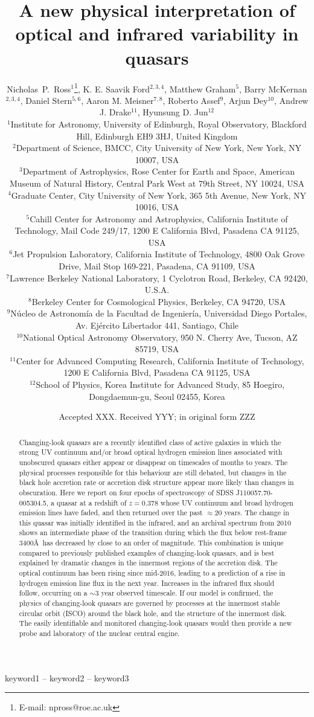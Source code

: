 \documentclass[a4paper,fleqn,usenatbib]{mnras}
\title[J1100-0053: A UV Collapsar]{A new physical interpretation of optical and infrared variability in quasars}
\author[N.P. Ross et al.]
{Nicholas~P.~Ross$^{1}$\thanks{E-mail: npross@roe.ac.uk},    
K. E. Saavik Ford$^{2,3,4}$,  Matthew Graham$^{5}$,  Barry McKernan$^{2,3,4}$,  
\newauthor Daniel Stern$^{5,6}$, Aaron M. Meisner$^{7,8}$, Roberto Assef$^{9}$, 
Arjun Dey$^{10}$, Andrew J. Drake$^{11}$, 
\newauthor Hyunsung D. Jun$^{12}$ 
\\
$^{1}$Institute for Astronomy, University of Edinburgh, Royal Observatory, Blackford Hill, Edinburgh EH9 3HJ, United Kingdom \\
$^{2}$Department of Science, BMCC, City University of New York, New York, NY 10007, USA \\
$^{3}$Department of Astrophysics, Rose Center for Earth and Space, American Museum of Natural History, Central Park West at 79th Street, NY 10024, USA \\
$^{4}$Graduate Center, City University of New York, 365 5th Avenue, New York, NY 10016, USA\\
$^{5}$Cahill Center for Astronomy and Astrophysics, California Institute of Technology, Mail Code 249/17, 1200 E California Blvd, Pasadena CA 91125, USA\\
$^{6}$Jet Propulsion Laboratory, California Institute of Technology, 4800 Oak Grove Drive, Mail Stop 169-221, Pasadena, CA 91109, USA \\
$^{7}$Lawrence Berkeley National Laboratory, 1 Cyclotron Road, Berkeley, CA 92420, U.S.A. \\
$^{8}$Berkeley Center for Cosmological Physics, Berkeley, CA 94720, USA\\
$^{9}$N\'ucleo de Astronom\'ia de la Facultad de Ingenier\'ia,  Universidad Diego Portales, Av. Ej\'ercito Libertador 441, Santiago, Chile\\
$^{10}$National Optical Astronomy Observatory, 950 N. Cherry Ave, Tucson, AZ 85719, USA \\
$^{11}$Center for Advanced Computing Research, California Institute of Technology, 1200 E California Blvd, Pasadena CA 91125, USA \\
$^{12}$School of Physics, Korea Institute for Advanced Study, 85 Hoegiro, Dongdaemun-gu, Seoul 02455, Korea\\
}
\date{Accepted XXX. Received YYY; in original form ZZZ}
\begin{document}
\label{firstpage}
\pagerange{\pageref{firstpage}--\pageref{lastpage}}
\maketitle


\begin{abstract}
Changing-look quasars are a recently identified class of active
galaxies in which the strong UV continuum and/or broad optical
hydrogen emission lines associated with unobscured quasars either
appear or disappear on timescales of months to years.  The physical
processes responsible for this behaviour are still debated, but
changes in the black hole accretion rate or accretion disk structure
appear more likely than changes in obscuration.  Here we report on
four epochs of spectroscopy of SDSS J110057.70-005304.5, a quasar at a
redshift of $z=0.378$ whose UV continuum and broad hydrogen emission
lines have faded, and then returned over the past $\approx$20
years. The change in this quasar was initially identified in the
infrared, and an archival spectrum from 2010 shows an intermediate
phase of the transition during which the flux below rest-frame
3400\AA\ has decreased by close to an order of magnitude. This
combination is unique compared to previously published examples of
changing-look quasars, and is best explained by dramatic changes in
the innermost regions of the accretion disk. The optical continuum has
been rising since mid-2016, leading to a prediction of a rise in
hydrogen emission line flux in the next year. Increases in the
infrared flux should follow, occurring on a $\sim$3 year observed
timescale. If our model is confirmed, the physics of changing-look
quasars are governed by processes at the innermost stable circular
orbit (ISCO) around the black hole, and the structure of the innermost
disk. The easily identifiable and monitored changing-look quasars
would then provide a new probe and laboratory of the nuclear central
engine.
\end{abstract}

\begin{keywords}
keyword1 -- keyword2 -- keyword3
\end{keywords}




\end{document}
